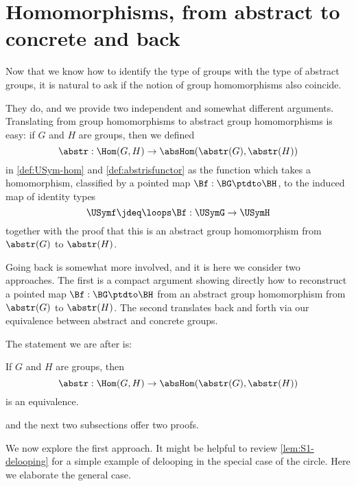 \section{Homomorphisms, from abstract to concrete and back}
\label{sec:homabsisconcr}

Now that we know how to identify the type of groups with the type 
of abstract groups, it is natural to ask if the notion of group 
homomorphisms also coincide.

They do, and we provide two independent and somewhat different arguments.
Translating from group homomorphisms to abstract group homomorphisms is easy:
if $G$ and $H$ are groups, then we defined
$$\abstr:\Hom(G,H)\to\absHom(\abstr(G),\abstr(H))$$
in \cref{def:USym-hom} and \cref{def:abstrisfunctor} as the function
which takes a homomorphism, classified by a pointed map $\Bf:\BG\ptdto\BH$,
to the induced map of identity types
$$\USymf \jdeq \loops\Bf:\USymG\to\USymH$$
together with the proof that this is an abstract group 
homomorphism from $\abstr(G)$ to $\abstr(H)$.

Going back is somewhat more involved, and it is here we consider
two approaches. The first is a compact argument showing directly how to
reconstruct a pointed map $\Bf:\BG\ptdto\BH$ from an abstract group
homomorphism from $\abstr(G)$ to $\abstr(H)$. The second translates 
back and forth via our equivalence between abstract and concrete groups.

The statement we are after is:
\begin{lemma}
  \label{lem:homomabstrconcr}
  If $G$ and $H$ are groups, then
$$\abstr:\Hom(G,H)\to\absHom(\abstr(G),\abstr(H))$$
is an equivalence.
\end{lemma}
and the next two subsections offer two proofs.



\label{sec:delooping} %
We now explore the first approach.
It might be helpful to review \cref{lem:S1-delooping}
for a simple example of delooping in the special case of the circle.
Here we elaborate the general case.

